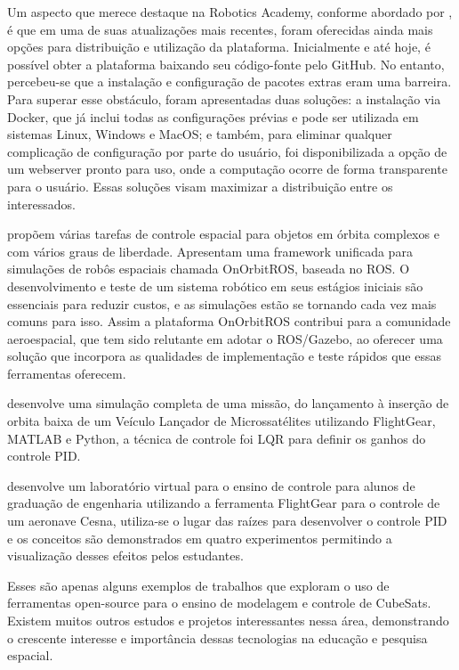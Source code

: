 Um aspecto que merece destaque na Robotics Academy, conforme abordado por , é que em uma de suas atualizações mais recentes, foram oferecidas ainda mais opções para distribuição e utilização da plataforma. Inicialmente e até hoje, é possível obter a plataforma baixando seu código-fonte pelo GitHub. No entanto, percebeu-se que a instalação e configuração de pacotes extras eram uma barreira. Para superar esse obstáculo, foram apresentadas duas soluções: a instalação via Docker, que já inclui todas as configurações prévias e pode ser utilizada em sistemas Linux, Windows e MacOS; e também, para eliminar qualquer complicação de configuração por parte do usuário, foi disponibilizada a opção de um webserver pronto para uso, onde a computação ocorre de forma transparente para o usuário. Essas soluções visam maximizar a distribuição entre os interessados.

 propõem várias tarefas de controle espacial para objetos em órbita complexos e com vários graus de liberdade. Apresentam uma framework unificada para simulações de robôs espaciais chamada OnOrbitROS, baseada no ROS. O desenvolvimento e teste de um sistema robótico em seus estágios iniciais são essenciais para reduzir custos, e as simulações estão se tornando cada vez mais comuns para isso. Assim a plataforma OnOrbitROS contribui para a comunidade aeroespacial, que tem sido relutante em adotar o ROS/Gazebo, ao oferecer uma solução que incorpora as qualidades de implementação e teste rápidos que essas ferramentas oferecem.

 desenvolve uma simulação completa de uma missão, do lançamento à inserção de orbita baixa de um Veículo Lançador de Microssatélites utilizando FlightGear, MATLAB e Python, a técnica de controle foi LQR para definir os ganhos do controle PID. 

 desenvolve um laboratório virtual para o ensino de controle para alunos de graduação de engenharia utilizando a ferramenta FlightGear para o controle de um aeronave Cesna, utiliza-se o lugar das raízes para desenvolver o controle PID e os conceitos são demonstrados em quatro experimentos  permitindo a visualização desses efeitos pelos estudantes.

Esses são apenas alguns exemplos de trabalhos que exploram o uso de ferramentas open-source para o ensino de modelagem e controle de CubeSats. Existem muitos outros estudos e projetos interessantes nessa área, demonstrando o crescente interesse e importância dessas tecnologias na educação e pesquisa espacial.